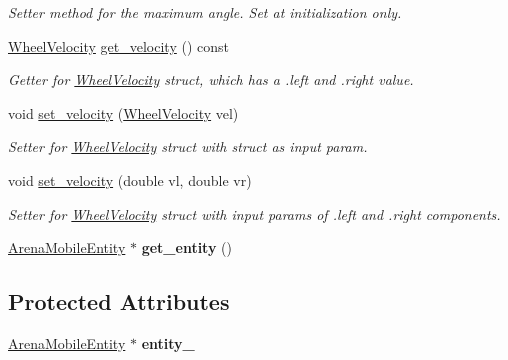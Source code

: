\begin{DoxyCompactItemize}
\begin{DoxyCompactList}\small\item\em Setter method for the maximum angle. Set at initialization only. \end{DoxyCompactList}\item 
\hyperlink{structWheelVelocity}{Wheel\+Velocity} \hyperlink{classMotionHandler_a99fe1b248e817556de2b366a2d98c57c}{get\+\_\+velocity} () const \hypertarget{classMotionHandler_a99fe1b248e817556de2b366a2d98c57c}{}\label{classMotionHandler_a99fe1b248e817556de2b366a2d98c57c}

\begin{DoxyCompactList}\small\item\em Getter for \hyperlink{structWheelVelocity}{Wheel\+Velocity} struct, which has a .left and .right value. \end{DoxyCompactList}\item 
void \hyperlink{classMotionHandler_ac4bf67ba783c1afb5a5839229de3f3f9}{set\+\_\+velocity} (\hyperlink{structWheelVelocity}{Wheel\+Velocity} vel)\hypertarget{classMotionHandler_ac4bf67ba783c1afb5a5839229de3f3f9}{}\label{classMotionHandler_ac4bf67ba783c1afb5a5839229de3f3f9}

\begin{DoxyCompactList}\small\item\em Setter for \hyperlink{structWheelVelocity}{Wheel\+Velocity} struct with struct as input param. \end{DoxyCompactList}\item 
void \hyperlink{classMotionHandler_af31975aa667ca20835e4d5bb0216706e}{set\+\_\+velocity} (double vl, double vr)\hypertarget{classMotionHandler_af31975aa667ca20835e4d5bb0216706e}{}\label{classMotionHandler_af31975aa667ca20835e4d5bb0216706e}

\begin{DoxyCompactList}\small\item\em Setter for \hyperlink{structWheelVelocity}{Wheel\+Velocity} struct with input params of .left and .right components. \end{DoxyCompactList}\item 
\hyperlink{classArenaMobileEntity}{Arena\+Mobile\+Entity} $\ast$ {\bfseries get\+\_\+entity} ()\hypertarget{classMotionHandler_ad8472612d15be1ada7f919f45d245adc}{}\label{classMotionHandler_ad8472612d15be1ada7f919f45d245adc}

\end{DoxyCompactItemize}
\subsection*{Protected Attributes}
\begin{DoxyCompactItemize}
\item 
\hyperlink{classArenaMobileEntity}{Arena\+Mobile\+Entity} $\ast$ {\bfseries entity\+\_\+}\hypertarget{classMotionHandler_a659fd1ec8878260a63779bf45681f5a4}{}\label{classMotionHandler_a659fd1ec8878260a63779bf45681f5a4}

\end{DoxyCompactItemize}


